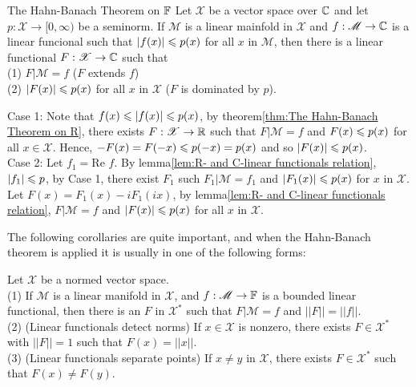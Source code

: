\begin{theorem}{The Hahn-Banach Theorem on $\mathbb{F}$}{}
    Let $\mathscr{X}$ be a vector space over $\mathbb{C}$ and let $p:\mathscr{X}\rightarrow [0,\infty)$ be a seminorm.
    If $\mathscr{M}$ is a linear mainfold in $\mathscr{X}$ and $f:\mathscr{M}\rightarrow \mathbb{C}$ is a linear funcional
    such that $|f(x)|\leqslant p(x)$ for all $x$ in $\mathscr{M}$, 
    then there is a linear functional $F:\mathscr{X}\rightarrow \mathbb{C}$ 
    such that \\
    (1) $F|\mathscr{M}=f$ ($F$ extends $f$)\\
    (2) $|F(x)|\leqslant p(x)$ for all $x$ in $\mathscr{X}$ ($F$ is dominated by $p$).
\end{theorem}

\begin{proofsolution}
    Case 1: Note that $f(x)\leqslant |f(x)|\leqslant p(x)$, by theorem\ref{thm:The Hahn-Banach Theorem on R},
    there exists $F:\mathscr{X}\rightarrow \mathbb{R}$ such that $F|\mathscr{M}=f$ and $F(x)\leqslant p(x)$ for all $x\in\mathscr{X}$.
    Hence, $-F(x)=F(-x)\leqslant p(-x)=p(x)$ and so $|F(x)|\leqslant p(x)$.
    \\
    Case 2:
    Let $f_1=\text{Re }f$. By lemma\ref{lem:R- and C-linear functionals relation}, $|f_1|\leqslant p$, 
    by Case 1, there exist $F_1$ such $F_1|\mathscr{M}=f_1$ and $|F_1(x)|\leqslant p(x)$ for $x$ in $\mathscr{X}$.
    Let $F(x)=F_1(x)-iF_1(ix)$, by lemma\ref{lem:R- and C-linear functionals relation}, 
    $F|\mathscr{M}=f$ and $|F(x)|\leqslant p(x)$ for all $x$ in $\mathscr{X}$.
\end{proofsolution}

The following corollaries are quite important, and when the Hahn-Banach theorem
is applied it is usually in one of the following forms:

\begin{corollary}{}{}
    Let $\mathscr{X}$ be a normed vector space.\\
    (1) If $\mathscr{M}$ is a linear manifold in $\mathscr{X}$, 
    and $f:\mathscr{M}\rightarrow \mathbb{F}$ is a bounded linear functional, then there is an $F$ in $\mathscr{X}^*$
    such that $F|\mathscr{M}=f$ and $||F||=||f||$.\\
    (2) (Linear functionals detect norms)
    If $x\in\mathscr{X}$ is nonzero, there exists $F\in\mathscr{X}^*$ with $||F||=1$ such that $F(x)=||x||$.\\
    (3) (Linear functionals separate points)
    If $x\neq y$ in $\mathscr{X}$, there exists $F\in\mathscr{X}^*$ such that $F(x)\neq F(y)$.\\
\end{corollary}

